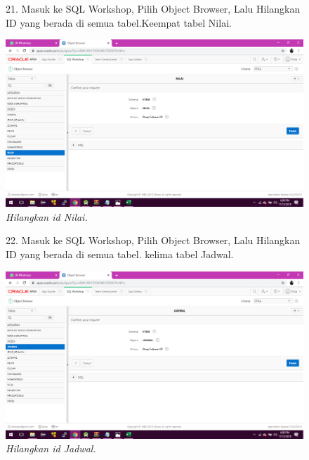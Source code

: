 \begin{enumerate}
\begin{figure}
\item[21.]Masuk ke SQL Workshop, Pilih Object Browser, Lalu Hilangkan ID yang berada di semua tabel.Keempat tabel Nilai.        
    \begin{center}
    \includegraphics[scale=0.3]{figures/34.png}
    \caption{\textit{Hilangkan id Nilai.}}
    \end{center}
    \label{gambar}
    \end{figure}

\begin{figure}
\item[22.]Masuk ke SQL Workshop, Pilih Object Browser, Lalu Hilangkan ID yang berada di semua tabel. kelima tabel Jadwal.        
    \begin{center}
    \includegraphics[scale=0.3]{figures/37.png}
    \caption{\textit{Hilangkan id Jadwal.}}
    \end{center}
    \label{gambar}
    \end{figure}
    

\end{enumerate}
